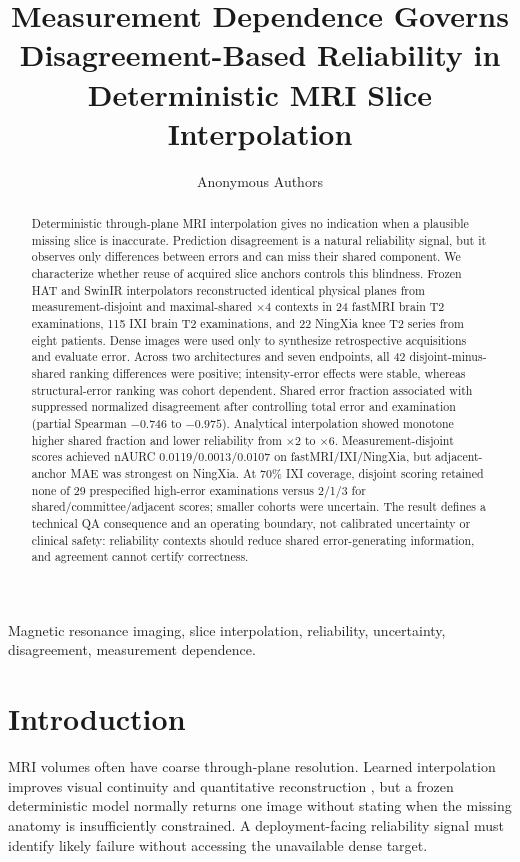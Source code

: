 \documentclass[journal,10pt]{IEEEtran}
\begin{document}
\title{Measurement Dependence Governs Disagreement-Based Reliability in Deterministic MRI Slice Interpolation}
\author{Anonymous Authors}
\maketitle

\begin{abstract}
Deterministic through-plane MRI interpolation gives no indication when a plausible missing slice is inaccurate. Prediction disagreement is a natural reliability signal, but it observes only differences between errors and can miss their shared component. We characterize whether reuse of acquired slice anchors controls this blindness. Frozen HAT and SwinIR interpolators reconstructed identical physical planes from measurement-disjoint and maximal-shared $\times4$ contexts in 24 fastMRI brain T2 examinations, 115 IXI brain T2 examinations, and 22 NingXia knee T2 series from eight patients. Dense images were used only to synthesize retrospective acquisitions and evaluate error. Across two architectures and seven endpoints, all 42 disjoint-minus-shared ranking differences were positive; intensity-error effects were stable, whereas structural-error ranking was cohort dependent. Shared error fraction associated with suppressed normalized disagreement after controlling total error and examination (partial Spearman $-0.746$ to $-0.975$). Analytical interpolation showed monotone higher shared fraction and lower reliability from $\times2$ to $\times6$. Measurement-disjoint scores achieved nAURC 0.0119/0.0013/0.0107 on fastMRI/IXI/NingXia, but adjacent-anchor MAE was strongest on NingXia. At 70\% IXI coverage, disjoint scoring retained none of 29 prespecified high-error examinations versus 2/1/3 for shared/committee/adjacent scores; smaller cohorts were uncertain. The result defines a technical QA consequence and an operating boundary, not calibrated uncertainty or clinical safety: reliability contexts should reduce shared error-generating information, and agreement cannot certify correctness.
\end{abstract}

\begin{IEEEkeywords}
Magnetic resonance imaging, slice interpolation, reliability, uncertainty, disagreement, measurement dependence.
\end{IEEEkeywords}

\section{Introduction}
 MRI volumes often have coarse through-plane resolution. Learned interpolation improves visual continuity and quantitative reconstruction \cite{peng2020saint,song2024i3net}, but a frozen deterministic model normally returns one image without stating when the missing anatomy is insufficiently constrained. A deployment-facing reliability signal must identify likely failure without accessing the unavailable dense target.
\end{document}
